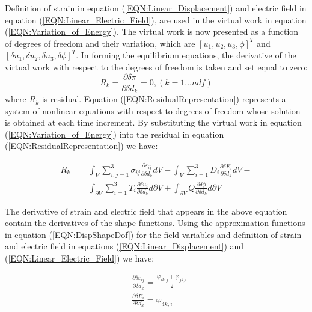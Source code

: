 Definition of strain in equation (\ref{EQN:Linear_Displacement}) and electric field in equation (\ref{EQN:Linear_Electric_Field}), are used in the virtual work in equation (\ref{EQN:Variation_of_Energy}). 
The virtual work is now presented as a function of degrees of freedom and their variation, which are $[u_1,u_2,u_3,\phi]^T$ and $[\delta u_1,\delta u_2,\delta u_3,\delta \phi]^T$. 
In forming the equilibrium equations, the derivative of the virtual work with respect to the degrees of freedom is taken and set equal to zero:
\begin{equation}
R_k=\frac{\partial \delta \pi}{\partial \delta d_k}=0 ,(k=1\dots ndf)
\label{EQN:ResidualRepresentation}
\end{equation}
where $R_k$ is residual. Equation (\ref{EQN:ResidualRepresentation}) represents a system of nonlinear equations with respect to degrees of freedom whose solution is obtained at each time increment. 
By substituting the virtual work in equation (\ref{EQN:Variation_of_Energy}) into the residual in equation (\ref{EQN:ResidualRepresentation}) we have:

\begin{equation}
\begin{aligned}
R_k=
& \int_V 
\sum_{i,j=1}^3 \sigma_{ij} \frac{\partial \varepsilon_{ij}}{\partial \delta d_k}dV-
\int_V 
\sum_{i=1}^3 D_{i} \frac{\partial \delta E_{i}}{\partial \delta d_k}  dV- \\
& \int_{\partial V} \sum_{i=1}^3 T_{i} \frac{\partial \delta u_{i}}{\partial \delta d_k}  d{\partial V}+
\int_{\partial V} 
Q \frac{\partial \delta \phi}{\partial \delta d_k}  d{\partial V} 
\end{aligned}
\label{EQN:Residual_Variation_of}
\end{equation}

The derivative of strain and electric field that appears in the above equation contain the derivatives of the shape functions. 
Using the approximation functions in equation (\ref{EQN:DispShapeDof}) for the field variables and definition of strain and electric field in equations (\ref{EQN:Linear_Displacement}) and (\ref{EQN:Linear_Electric_Field}) we have:

\begin{equation}
\begin{aligned}
&\frac{\partial \delta \varepsilon_{ij}}{\partial \delta d_k}=\frac{\varphi_{ik,j}+\varphi_{jk,i}}{2} \\
&\frac{\partial \delta E_{i}}{\partial \delta d_k}= \varphi_{4k,i}\\
\end{aligned}
\label{EQN:Shape_Fucntion_Derivitive}
\end{equation}

